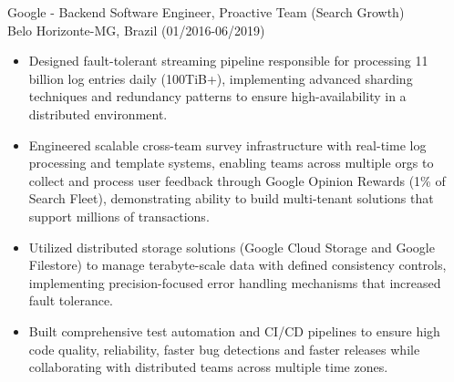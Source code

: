 
\normalsize{Google - Backend Software Engineer, Proactive Team (Search Growth)}\\
        \scriptsize{Belo Horizonte-MG, Brazil (01/2016-06/2019)}
\begin{itemize}
    \item \scriptsize{Designed fault-tolerant streaming pipeline responsible for processing 11 billion log entries
        daily (100TiB+), implementing advanced sharding techniques and redundancy patterns to ensure 
        high-availability in a distributed environment.}

    \item \scriptsize{Engineered scalable cross-team survey infrastructure with real-time log processing and
        template systems, enabling teams across multiple orgs to collect and process user feedback through Google
        Opinion Rewards (1\% of Search Fleet), demonstrating ability to build multi-tenant solutions that support
        millions of transactions.}
    
    \item \scriptsize{Utilized distributed storage solutions (Google Cloud Storage and Google Filestore)
        to manage terabyte-scale data with defined consistency controls, implementing precision-focused error
        handling mechanisms that increased fault tolerance.}

    \item \scriptsize{Built comprehensive test automation and CI/CD pipelines to ensure high code quality,
        reliability, faster bug detections and faster releases while collaborating with distributed teams across
        multiple time zones.}
\end{itemize}